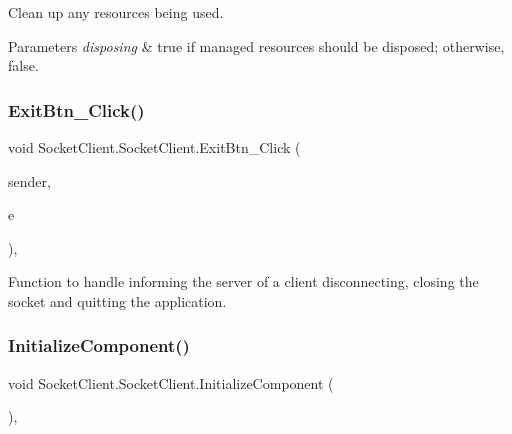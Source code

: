 Clean up any resources being used. 


\begin{DoxyParams}{Parameters}
{\em disposing} & true if managed resources should be disposed; otherwise, false.\\
\hline
\end{DoxyParams}
\mbox{\label{class_socket_client_1_1_socket_client_aa1542d2df54e6322e37d87724ff01391}} 
\subsubsection{\texorpdfstring{Exit\+Btn\+\_\+\+Click()}{ExitBtn\_Click()}}
{\footnotesize\ttfamily void Socket\+Client.\+Socket\+Client.\+Exit\+Btn\+\_\+\+Click (\begin{DoxyParamCaption}\item[{object}]{sender,  }\item[{Event\+Args}]{e }\end{DoxyParamCaption})\hspace{0.3cm}{\ttfamily [inline]}, {\ttfamily [private]}}

Function to handle informing the server of a client disconnecting, closing the socket and quitting the application. \mbox{\label{class_socket_client_1_1_socket_client_ae31dc82e1b1d076129b128b42886be56}} 
\subsubsection{\texorpdfstring{Initialize\+Component()}{InitializeComponent()}}
{\footnotesize\ttfamily void Socket\+Client.\+Socket\+Client.\+Initialize\+Component (\begin{DoxyParamCaption}{ }\end{DoxyParamCaption})\hspace{0.3cm}{\ttfamily [inline]}, {\ttfamily [private]}}



